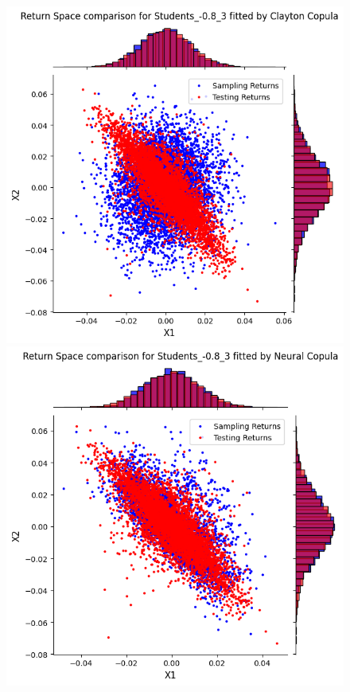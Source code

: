 \documentclass[%
a4paper,							
11pt,								
bibliography=totoc,						
abstracton=true					
]
{scrartcl}
\theoremstyle{plain}
\theoremstyle{definition}
\theoremstyle{remark}
\newcommand{\1}{\mathbbm{1}}
\begin{document}
\begin{figure}[H]
\begin{minipage}{0.49\textwidth}
    \end{minipage}
    \vfill
    \begin{minipage}{0.49\textwidth}
        \centering
        \includegraphics[width=\textwidth]{5ResultsDiscussion/pictures/PortfolioTest/Port3Clayton.png}
    \end{minipage}
    \hfill
    \begin{minipage}{0.49\textwidth}
        \centering
        \includegraphics[width=\textwidth]{5ResultsDiscussion/pictures/PortfolioTest/Port3NC.png}

\end{minipage}
\end{figure}
\end{document}
